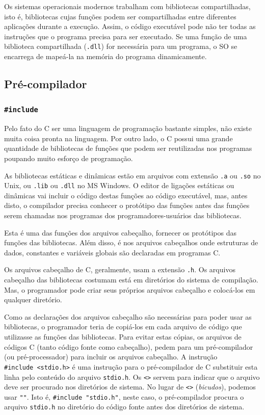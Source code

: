 \documentclass[
]{article}
\begin{document}
Os sistemas operacionais modernos trabalham com bibliotecas
compartilhadas, isto é, bibliotecas cujas funções podem ser
compartilhadas entre diferentes aplicações durante a execução. Assim, o
código executável pode não ter todas as instruções que o programa
precisa para ser executado. Se uma função de uma biblioteca
compartilhada (\texttt{.dll}) for necessária para um programa, o SO se
encarrega de mapeá-la na memória do programa dinamicamente.

\hypertarget{pruxe9-compilador}{%
\subsection{Pré-compilador}\label{pruxe9-compilador}}

\hypertarget{include}{%
\subsubsection{\texorpdfstring{\texttt{\#include}}{\#include}}\label{include}}

Pelo fato do C ser uma linguagem de programação bastante simples, não
existe muita coisa pronta na linguagem. Por outro lado, o C possui uma
grande quantidade de bibliotecas de funções que podem ser reutilizadas
nos programas poupando muito esforço de programação.

As bibliotecas estáticas e dinâmicas estão em arquivos com extensão
\texttt{.a} ou \texttt{.so} no Unix, ou \texttt{.lib} ou \texttt{.dll}
no MS Windows. O editor de ligações estáticas ou dinâmicas vai incluir o
código destas funções ao código executável, mas, antes disto, o
compilador precisa conhecer o protótipo das funções antes das funções
serem chamadas nos programas dos programadores-usuários das bibliotecas.

Esta é uma das funções dos arquivos cabeçalho, fornecer os protótipos
das funções das bibliotecas. Além disso, é nos arquivos cabeçalhos onde
estruturas de dados, constantes e variáveis globais são declaradas em
programas C.

Os arquivos cabeçalho de C, geralmente, usam a extensão \texttt{.h}. Os
arquivos cabeçalho das bibliotecas costumam está em diretórios do
sistema de compilação. Mas, o programador pode criar seus próprios
arquivos cabeçalho e colocá-los em qualquer diretório.

Como as declarações dos arquivos cabeçalho são necessárias para poder
usar as bibliotecas, o programador teria de copiá-los em cada arquivo de
código que utilizasse as funções das bibliotecas. Para evitar estas
cópias, os arquivos de códigos C (tanto código fonte como cabeçalho),
pedem para um pré-compilador (ou pré-processador) para incluir os
arquivos cabeçalho. A instrução
\texttt{\#include\ \textless{}stdio.h\textgreater{}} é uma instrução
para o pré-compilador de C substituir esta linha pelo conteúdo do
arquivo \texttt{stdio.h}. Os \texttt{\textless{}\textgreater{}} servem
para indicar que o arquivo deve ser procurado nos diretórios de sistema.
No lugar de \texttt{\textless{}\textgreater{}} (\emph{bicudos}), podemos
usar \texttt{""}. Isto é, \texttt{\#include\ "stdio.h"}, neste caso, o
pré-compilador procura o arquivo \texttt{stdio.h} no diretório do código
fonte antes dos diretórios de sistema.
\end{document}

